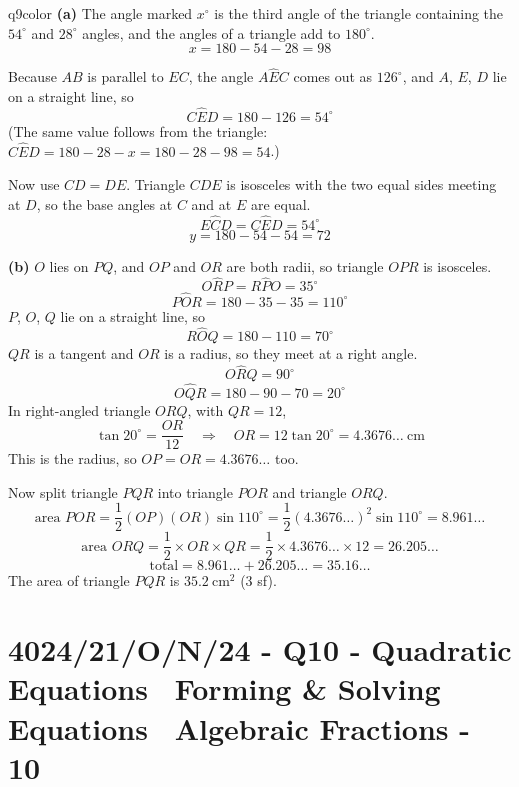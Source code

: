 \documentclass[11pt,a4paper]{article}
\newcommand{\examq}[4]{\section[#1 - Q#2]{#1 - Q#2 - #3 - #4}}
\begin{document}
\begin{ansbox}{q9color}
\textbf{(a)} The angle marked $x^{\circ}$ is the third angle of the triangle containing the $54^{\circ}$ and $28^{\circ}$ angles, and the angles of a triangle add to $180^{\circ}$.
\[ x = 180 - 54 - 28 = 98 \]

Because $AB$ is parallel to $EC$, the angle $A\hat{E}C$ comes out as $126^{\circ}$, and $A$, $E$, $D$ lie on a straight line, so
\[ C\hat{E}D = 180 - 126 = 54^{\circ} \]
(The same value follows from the triangle: $C\hat{E}D = 180 - 28 - x = 180 - 28 - 98 = 54$.)

Now use $CD = DE$. Triangle $CDE$ is isosceles with the two equal sides meeting at $D$, so the base angles at $C$ and at $E$ are equal.
\[ E\hat{C}D = C\hat{E}D = 54^{\circ} \]
\[ y = 180 - 54 - 54 = 72 \]

\textbf{(b)} $O$ lies on $PQ$, and $OP$ and $OR$ are both radii, so triangle $OPR$ is isosceles.
\[ O\hat{R}P = R\hat{P}O = 35^{\circ} \]
\[ P\hat{O}R = 180 - 35 - 35 = 110^{\circ} \]
$P$, $O$, $Q$ lie on a straight line, so
\[ R\hat{O}Q = 180 - 110 = 70^{\circ} \]
$QR$ is a tangent and $OR$ is a radius, so they meet at a right angle.
\[ O\hat{R}Q = 90^{\circ} \]
\[ O\hat{Q}R = 180 - 90 - 70 = 20^{\circ} \]
In right-angled triangle $ORQ$, with $QR = 12$,
\[ \tan 20^{\circ} = \frac{OR}{12} \quad \Rightarrow \quad OR = 12\tan 20^{\circ} = 4.3676\ldots\ \mathrm{cm} \]
This is the radius, so $OP = OR = 4.3676\ldots$ too.

Now split triangle $PQR$ into triangle $POR$ and triangle $ORQ$.
\[ \text{area } POR = \frac{1}{2}(OP)(OR)\sin 110^{\circ} = \frac{1}{2}(4.3676\ldots)^2 \sin 110^{\circ} = 8.961\ldots \]
\[ \text{area } ORQ = \frac{1}{2} \times OR \times QR = \frac{1}{2} \times 4.3676\ldots \times 12 = 26.205\ldots \]
\[ \text{total} = 8.961\ldots + 26.205\ldots = 35.16\ldots \]
The area of triangle $PQR$ is $35.2\ \mathrm{cm^2}$ (3 sf).
\end{ansbox}

\examq{4024/21/O/N/24}{10}{Quadratic Equations \textperiodcentered\ Forming \& Solving Equations \textperiodcentered\ Algebraic Fractions}{10}
\end{document}
